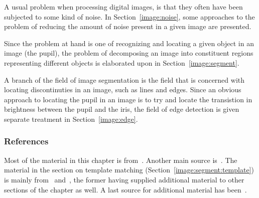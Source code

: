 A usual problem when processing digital images, is that they often
have been subjected to some kind of noise.  In
Section~\ref{image:noise}, some approaches to the problem of reducing
the amount of noise present in a given image are presented.  

Since the problem at hand is one of recognizing and locating a given
object in an image (the pupil), the problem of decomposing an image
into constituent regions representing different objects is elaborated
upon in Section~\ref{image:segment}.  

A branch of the field of image segmentation is the field that is
concerned with locating discontinuties in an image, such as lines and
edges.  Since an obvious approach to locating the pupil in an image is
to try and locate the transistion in brightness between the pupil and
the iris, the field of edge detection is given separate treatment in
Section~\ref{image:edge}.  

\subsubsection{References}

Most of the material in this chapter is from~\cite{digim}.  Another
main source is~\cite{digpic}.  The material in the section on template
matching (Section~\ref{image:segment:template}) is mainly
from~\cite{digpat} and~\cite{template}, the former having supplied
additional material to other sections of the chapter as well.  A last
source for additional material has been~\cite{digbild}.
